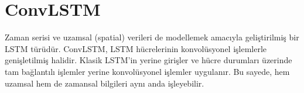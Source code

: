 \section{ConvLSTM}
Zaman serisi ve uzamsal (spatial) verileri de modellemek amacıyla geliştirilmiş bir LSTM türüdür. ConvLSTM, LSTM hücrelerinin konvolüsyonel işlemlerle genişletilmiş halidir. Klasik LSTM'in yerine girişler ve hücre durumları üzerinde tam bağlantılı işlemler yerine konvolüsyonel işlemler uygulanır. Bu sayede, hem uzamsal hem de zamansal bilgileri aynı anda işleyebilir.

\newpage